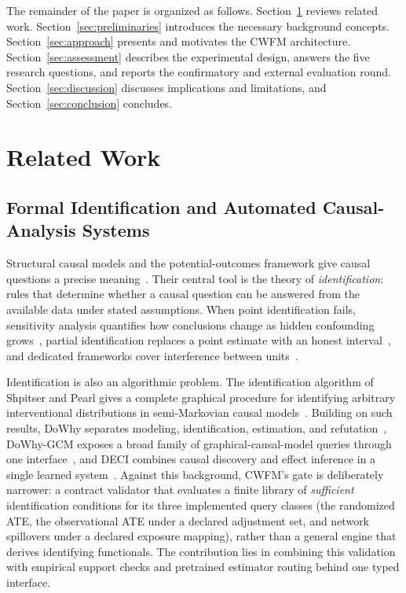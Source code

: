 \documentclass[electronics,article,submit,oneauthor]{Definitions/mdpi}
\begin{document}
The remainder of the paper is organized as follows. Section~\ref{sec:related} reviews related work. Section~\ref{sec:preliminaries} introduces the necessary background concepts. Section~\ref{sec:approach} presents and motivates the CWFM architecture. Section~\ref{sec:assessment} describes the experimental design, answers the five research questions, and reports the confirmatory and external evaluation round. Section~\ref{sec:discussion} discusses implications and limitations, and Section~\ref{sec:conclusion} concludes.

\section{Related Work}\label{sec:related}

\subsection{Formal Identification and Automated Causal-Analysis Systems}\label{sec:related-causal}

Structural causal models and the potential-outcomes framework give causal questions a precise meaning~\cite{pearl2009causality,hernan2020whatif}. Their central tool is the theory of \emph{identification}: rules that determine whether a causal question can be answered from the available data under stated assumptions. When point identification fails, sensitivity analysis quantifies how conclusions change as hidden confounding grows~\cite{rosenbaum1983sensitivity}, partial identification replaces a point estimate with an honest interval~\cite{manski1990bounds}, and dedicated frameworks cover interference between units~\cite{hudgens2008interference}.

Identification is also an algorithmic problem. The identification algorithm of Shpitser and Pearl gives a complete graphical procedure for identifying arbitrary interventional distributions in semi-Markovian causal models~\cite{shpitser2006identification}. Building on such results, DoWhy separates modeling, identification, estimation, and refutation~\cite{sharma2020dowhy}, DoWhy-GCM exposes a broad family of graphical-causal-model queries through one interface~\cite{blobaum2024dowhygcm}, and DECI combines causal discovery and effect inference in a single learned system~\cite{geffner2022deci}. Against this background, CWFM's gate is deliberately narrower: a contract validator that evaluates a finite library of \emph{sufficient} identification conditions for its three implemented query classes (the randomized ATE, the observational ATE under a declared adjustment set, and network spillovers under a declared exposure mapping), rather than a general engine that derives identifying functionals. The contribution lies in combining this validation with empirical support checks and pretrained estimator routing behind one typed interface.
\end{document}
